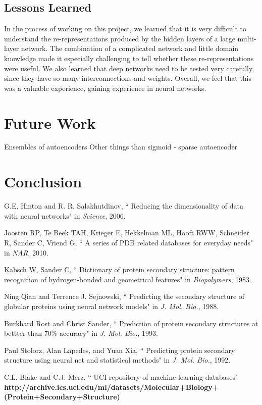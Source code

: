 \documentclass[letterpaper,twocolumn,12pt]{article}
\begin{document}
\subsection{Lessons Learned}
In the process of working on this project, we learned that it is very difficult to understand the re-representations produced by the hidden layers of a large multi-layer network.
The combination of a complicated network and little domain knowledge made it especially challenging to tell whether these re-representations were useful.
We also learned that deep networks need to be tested very carefully, since they have so many interconnections and weights.
Overall, we feel that this was a valuable experience, gaining experience in neural networks.

\section{Future Work}
Ensembles of autoencoders
Other things than sigmoid
- sparse autoencoder 

\section{Conclusion}


\begin{thebibliography}{9}


G.E. Hinton and R. R. Salakhutdinov,
   `` Reducing the dimensionality of data with neural networks"
   in \emph{Science}, 2006.

Joosten RP, Te Beek TAH, Krieger E, Hekkelman ML, Hooft RWW, Schneider R, Sander C, Vriend G,
   `` A series of PDB related databases for everyday needs"
   in \emph{NAR}, 2010.

Kabsch W, Sander C,
   `` Dictionary of protein secondary structure: pattern recognition of hydrogen-bonded and geometrical features"
   in \emph{Biopolymers}, 1983.

Ning Qian and Terrence J. Sejnowski,
  `` Predicting the secondary structure of globular proteins using neural network models"
  in \emph{J. Mol. Bio.}, 1988.

Burkhard Rost and Christ Sander,
  `` Prediction of protein secondary structures at bettter than 70\% accuracy"
  in \emph{J. Mol. Bio.}, 1993.

Paul Stolorz, Alan Lapedes, and Yuan Xia,
   `` Predicting protein secondary structure using neural net and statistical methods"
   in \emph{J. Mol. Bio.}, 1992.

   C.L. Blake and C.J. Merz,
   `` UCI repository of machine learning databases"
   \textbf{http://archive.ics.uci.edu/ml/datasets/Molecular+Biology+(Protein+Secondary+Structure)}

\end{thebibliography}
\end{document}
